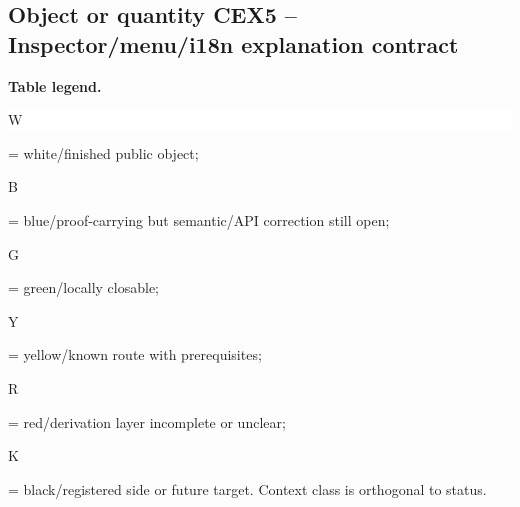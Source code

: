 \subsection*{Object or quantity CEX5 -- Inspector/\allowbreak{}menu/\allowbreak{}i18n explanation contract}
\hypertarget{objproof:CEX5}{}
\par\smallskip\noindent\begin{minipage}{0.99\linewidth}\footnotesize\raggedright\textbf{Table legend.} \colorbox{white}{\strut W} = white/finished public object; \colorbox{cyan!20}{\strut B} = blue/proof-carrying but semantic/API correction still open; \colorbox{green!18}{\strut G} = green/locally closable; \colorbox{yellow!25}{\strut Y} = yellow/known route with prerequisites; \colorbox{red!20}{\strut R} = red/derivation layer incomplete or unclear; \colorbox{black!18}{\strut K} = black/registered side or future target. Context class is orthogonal to status.\end{minipage}\par\vspace{0.25em}
